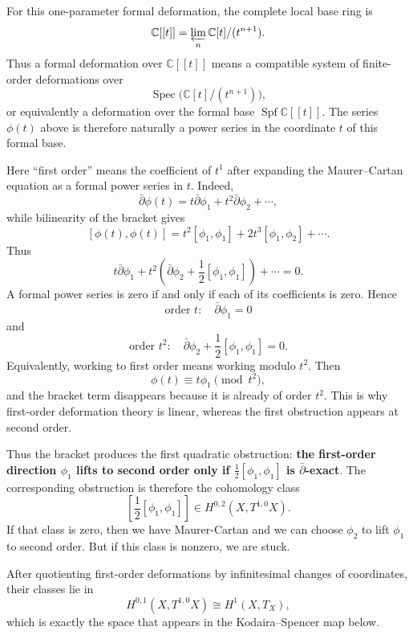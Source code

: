 For this one-parameter formal deformation, the complete
local base ring is
$$
\mathbb C[[t]]
=\varprojlim_n \mathbb C[t]/(t^{n+1}).
$$
Thus a formal deformation over $\mathbb C[[t]]$ means a
compatible system of finite-order deformations over
$$
\operatorname{Spec}\big(\mathbb C[t]/(t^{n+1})\big),
$$
or equivalently a deformation over the formal base
$\operatorname{Spf}\mathbb C[[t]]$. The series $\phi(t)$
above is therefore naturally a power series in the
coordinate $t$ of this formal base.

Here ``first order'' means the coefficient of $t^1$ after
expanding the Maurer--Cartan equation as a formal power
series in $t$. Indeed,
$$
\bar\partial\phi(t)
=t\bar\partial\phi_1+t^2\bar\partial\phi_2+\cdots,
$$
while bilinearity of the bracket gives
$$
[\phi(t),\phi(t)]
=t^2[\phi_1,\phi_1]
+2t^3[\phi_1,\phi_2]+\cdots.
$$
Thus
$$
t\bar\partial\phi_1
+t^2\left(
\bar\partial\phi_2+\frac12[\phi_1,\phi_1]
\right)
+\cdots=0.
$$
A formal power series is zero if and only if each of its
coefficients is zero. Hence
$$
\boxed{\text{order }t:\quad \bar\partial\phi_1=0}
$$
and
$$
\boxed{
\text{order }t^2:\quad
\bar\partial\phi_2+\frac12[\phi_1,\phi_1]=0.
}
$$
Equivalently, working to first order means working modulo
$t^2$. Then
$$
\phi(t)\equiv t\phi_1\pmod{t^2},
$$
and the bracket term disappears because it is already of
order $t^2$. This is why first-order deformation theory is
linear, whereas the first obstruction appears at second
order.

Thus the bracket produces the first quadratic
obstruction: {\bf the first-order direction $\phi_1$ lifts
to second order only if
$\frac12[\phi_1,\phi_1]$ is
$\bar\partial$-exact}.
The corresponding obstruction is therefore
the cohomology class
$$
\left[\frac{1}{2}[\phi_1,\phi_1]\right]
\in
H^{0,2}(X,T^{1,0}X).
$$
If that class is zero, then we have
Maurer-Cartan and we can choose $\phi_2$
to lift $\phi_1$ to second order.
But if this class is nonzero, we are stuck.


After quotienting first-order deformations by
infinitesimal changes of coordinates, their classes lie
in
$$
H^{0,1}(X,T^{1,0}X)\cong H^1(X,T_X),
$$
which is exactly the space that appears in the
Kodaira--Spencer map below.

